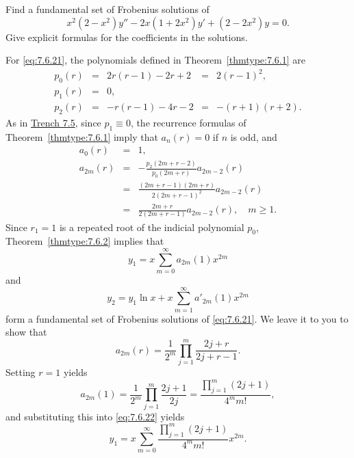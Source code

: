 \documentclass{ximera}
\begin{document}
\begin{example}\label{example:7.6.3}
Find a fundamental set of Frobenius  solutions of
\begin{equation} \label{eq:7.6.21}
x^2(2-x^2)y''-2x(1+2x^2)y'+(2-2x^2)y=0.
\end{equation}
Give explicit formulas for the coefficients in the solutions.

\begin{explanation}
For \eqref{eq:7.6.21}, the polynomials defined in
Theorem~\ref{thmtype:7.6.1} are
$$
\begin{array}{ccccc}
p_0(r)&=&2r(r-1)-2r+2&=&2(r-1)^2,\\
p_1(r)&=&0,\\
p_2(r)&=&-r(r-1)-4r-2&=&-(r+1)(r+2).
\end{array}
$$
As in \href{https://ximera.osu.edu/ode/main/frobeniusI/frobeniusI}{Trench 7.5}, since $p_1\equiv0$,  the recurrence
formulas
of Theorem~\ref{thmtype:7.6.1} imply that $a_n(r)=0$ if $n$ is odd, and
$$
\begin{array}{ccl}
a_0(r)&=&1,\\
a_{2m}(r)&=&-\frac{p_2(2m+r-2)}{p_0(2m+r)}a_{2m-2}(r)\\
&=&\frac{(2m+r-1)(2m+r)}{2(2m+r-1)^2}a_{2m-2}(r)\\
&=&\frac{2m+r}{2(2m+r-1)}a_{2m-2}(r),\quad m\geq 1.
\end{array}
$$
Since $r_1=1$ is a repeated root of the indicial polynomial $p_0$,
Theorem~\ref{thmtype:7.6.2} implies that
\begin{equation} \label{eq:7.6.22}
y_1=x\sum_{m=0}^\infty  a_{2m}(1)x^{2m}
\end{equation}
and
\begin{equation} \label{eq:7.6.23}
y_2=y_1\ln x+x\sum_{m=1}^\infty a'_{2m}(1)x^{2m}
\end{equation}
form a fundamental set of Frobenius solutions of \eqref{eq:7.6.21}.
We leave it to you to show  that
\begin{equation} \label{eq:7.6.24}
a_{2m}(r)=\frac{1}{2^m}\prod_{j=1}^m\frac{2j+r}{2j+r-1}.
\end{equation}
Setting $r=1$ yields
\begin{equation} \label{eq:7.6.25}
a_{2m}(1)=\frac{1}{2^m}\prod_{j=1}^m\frac{2j+1}{2j}
=\frac{\prod_{j=1}^m(2j+1)}{4^mm!},
\end{equation}
and substituting this into \eqref{eq:7.6.22} yields
$$
y_1=x\sum_{m=0}^\infty\frac{\prod_{j=1}^m(2j+1)}{4^mm!}x^{2m}.
$$


\end{explanation}
\end{example}
\end{document}
